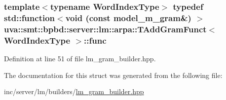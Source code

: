 \subsubsection[{func}]{\setlength{\rightskip}{0pt plus 5cm}template$<$typename Word\+Index\+Type$>$ typedef std\+::function$<$void (const {\bf model\+\_\+m\+\_\+gram}\&) $>$ {\bf uva\+::smt\+::bpbd\+::server\+::lm\+::arpa\+::\+T\+Add\+Gram\+Funct}$<$ Word\+Index\+Type $>$\+::{\bf func}}\label{structuva_1_1smt_1_1bpbd_1_1server_1_1lm_1_1arpa_1_1_t_add_gram_funct_ab4af90442a7127df3c8010eb3cec42e6}


Definition at line 51 of file lm\+\_\+gram\+\_\+builder.\+hpp.



The documentation for this struct was generated from the following file\+:\begin{DoxyCompactItemize}
\item 
inc/server/lm/builders/\hyperlink{lm__gram__builder_8hpp}{lm\+\_\+gram\+\_\+builder.\+hpp}\end{DoxyCompactItemize}
